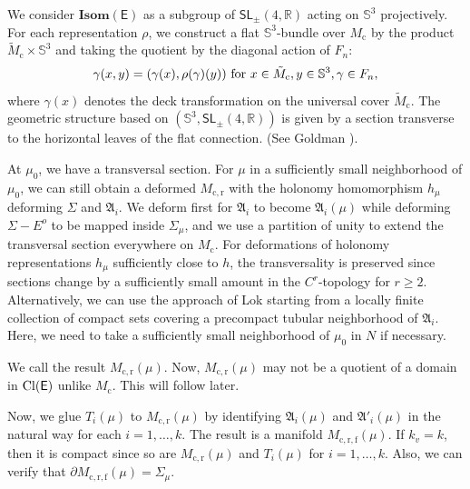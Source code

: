 \documentclass{amsart}
\numberwithin{equation}{section}
\newcommand\bR{{\mathbb{R}}}
\newcommand\SI{{\mathbb{S}}}
\newcommand\clo{{\rm Cl}}
\newcommand\eps{\epsilon}
\newcommand\Isom{{\mathbf{Isom}}}
\newcommand\SL{{\mathsf{SL}}}
\newcommand\Lspace{\mathsf E}
\theoremstyle{definition}
\theoremstyle{remark}
\newcommand{\romec}{\mathrm{c}}
\newcommand{\romecr}{{\mathrm{c}, \mathrm{r}}}
\newcommand{\romecrf}{{\mathrm{c}, \mathrm{r}, \mathrm{f}}}
\begin{document}
We consider $\Isom(\Lspace) $ as a subgroup of $\SL_\pm(4, \bR)$ acting on $\SI^3$ projectively. 
For each representation $\rho$, 
we construct a flat $\SI^3$-bundle over $M_{\romec}$ by the product
$\tilde M_{\romec} \times \SI^3$ and taking the quotient by the diagonal action of $F_n$: 
\[\gamma(x, y) = (\gamma(x), \rho(\gamma)(y)) \hbox{ for } x \in \tilde M_{\romec}, y\in \SI^3, \gamma \in F_n,\]
where $\gamma(x)$ denotes the deck transformation on the universal cover 
$\tilde M_{\romec}$.
The geometric structure based on $(\SI^3, \SL_\pm(4, \bR))$ is given 
by a section transverse to the horizontal leaves of the flat connection. 
(See Goldman \cite{G88}).

At $\mu_0$, we have a transversal section. For $\mu$ in a 
sufficiently small neighborhood of $\mu_0$, we 
can still obtain a deformed $M_{\romecr}$ with 
the holonomy homomorphism $h_\mu$ deforming $\Sigma$ and ${\mathfrak{A}}_i$.  
We deform first for ${\mathfrak{A}}_i$ to become ${\mathfrak{A}}_i(\mu)$ 
while deforming  
$\Sigma - E^o$ to be mapped inside $\Sigma_\mu$, and we use 
a partition of unity to extend the transversal section everywhere on $M_{\romec}$. 
For deformations of holonomy representations $h_\mu$ sufficiently close 
to $h$, the transversality is preserved since 
sections change by a sufficiently small amount 
in the $C^r$-topology for $r \geq 2$. 
Alternatively, we can use 
the approach of Lok \cite{Lok84} starting from a locally finite collection 
of compact sets covering a precompact tubular neighborhood of ${\mathfrak{A}}_i$.
Here, we need to take a sufficiently small neighborhood of $\mu_0$ in $N$ if necessary. 


We call the result $M_{\romecr}(\mu)$. Now, $M_{\romecr}(\mu)$ may not 
be a quotient of a domain 
in $\clo(\Lspace)$ unlike $M_{\romec}$.  This will follow later. 



Now, we glue $T_i(\mu)$ to $M_{\romecr}(\mu)$ by identifying ${\mathfrak{A}}_i(\mu)$ and ${\mathfrak{A}}'_i(\mu)$ in the natural way
for each $i=1,\dots, k$. 
The result is a manifold $M_{\romecrf}(\mu)$.  
If $k_v = k$, then 
it is compact 
since so are $M_{\romecr}(\mu)$ and $T_i(\mu)$ for $i= 1, \dots, k$.
Also, we can verify that $\partial M_{\romecrf}(\mu) = \Sigma_\mu$.  
\end{document}
